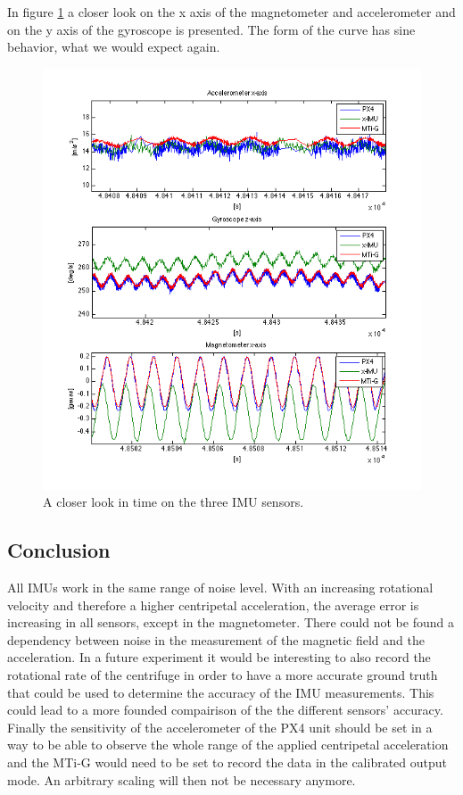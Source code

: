In figure \ref{ct_sine} a closer look on the x axis of the magnetometer and accelerometer and on the y axis of the gyroscope is presented. The form of the curve has sine behavior, what we would expect again.
\begin{figure}[hb]
\includegraphics[width=1\textwidth]{pictures/ct_sine.png}
\caption{A closer look in time on the three IMU sensors.}
\label{ct_sine}
\end{figure}

\subsection{Conclusion}
All IMUs work in the same range of noise level. With an increasing rotational velocity and therefore a higher centripetal acceleration, the average error is increasing in all sensors, except in the magnetometer. There could not be found a dependency between noise in the measurement of the magnetic field and the acceleration. 
In a future experiment it would be interesting to also record the rotational rate of the centrifuge in order to have a more accurate ground truth that could be used to determine the accuracy of the IMU measurements. This could lead to a more founded compairison of the the different sensors' accuracy. Finally the sensitivity of the accelerometer of the PX4 unit should be set in a way to be able to observe the whole range of the applied centripetal acceleration and the MTi-G would need to be set to record the data in the calibrated output mode. An arbitrary scaling will then not be necessary anymore.

